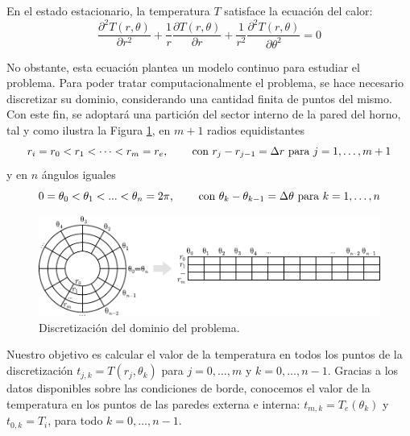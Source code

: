         En el estado estacionario, la temperatura $T$ satisface la ecuación del calor:
        \begin{equation} \label{des:eq:calor}
            \frac{\partial^2 T(r, \theta)}{\partial r^2} + \frac{1}{r} \frac{\partial T(r, \theta)}{\partial r} + \frac{1}{r^2} \frac{\partial^2 T(r, \theta)}{\partial \theta^2} = 0
        \end{equation}

        No obstante, esta ecuación plantea un modelo continuo para estudiar el problema. Para poder tratar computacionalmente el problema, se hace necesario discretizar su dominio, considerando una cantidad finita de puntos del mismo. Con este fin, se adoptará una partición del sector interno de la pared del horno, tal y como ilustra la Figura \ref{fig:discretizacion}, en $m + 1$ radios equidistantes 
        \[ r_i = r_0 < r_1 < \dots < r_m = r_e \text{, \qquad con } r_j - r_{j-1} = \Delta r \text{ para } j = 1, \dots, m+1 \]
        y en $n$ ángulos iguales
        \[ 0 = \theta_0 < \theta_1 < ... < \theta_n = 2\pi \text{, \qquad con } \theta_k - \theta_{k-1} = \Delta \theta \text{ para } k = 1, \dots, n \]

        \begin{figure}[h]
          \centering

          \includegraphics{imagenes/discretizacion.pdf}

          \caption{Discretización del dominio del problema.}
          \label{fig:discretizacion}
        \end{figure}

        Nuestro objetivo es calcular el valor de la temperatura en todos los puntos de la discretización $t_{j,k} = T(r_j, \theta_k)$ para $j = 0, \dots, m$ y $k = 0, \dots, n-1$. Gracias a los datos disponibles sobre las condiciones de borde, conocemos el valor de la temperatura en los puntos de las paredes externa e interna: $t_{m,k} = T_e(\theta_k)$ y $t_{0,k} = T_i$, para todo $k = 0, \dots, n-1$.

